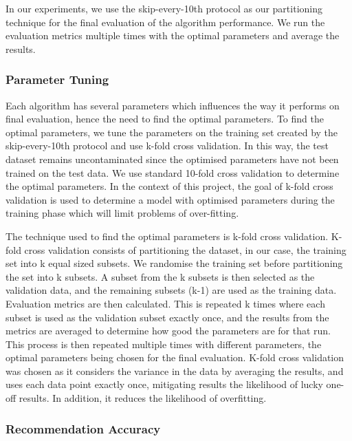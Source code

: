 In our experiments, we use the skip-every-10th protocol as our partitioning technique for the final evaluation of the algorithm performance. We run the evaluation metrics multiple times with the optimal parameters and average the results. 

\subsubsection{Parameter Tuning}

Each algorithm has several parameters which influences the way it performs on final evaluation, hence the need to find the optimal parameters. To find the optimal parameters, we tune the parameters on the training set created by the skip-every-10th protocol and use k-fold cross validation. In this way, the test dataset remains uncontaminated since the optimised parameters have not been trained on the test data. 
We use standard 10-fold cross validation to determine the optimal parameters. In the context of this project, the goal of k-fold cross validation is used to determine a model with optimised parameters during the training phase which will limit problems of over-fitting. 

The technique used to find the optimal parameters is k-fold cross validation. K-fold cross validation consists of partitioning the dataset, in our case, the training set into k equal sized subsets. We randomise the training set before partitioning the set into k subsets. A subset from the k subsets is then selected as the validation data, and the remaining subsets (k-1) are used as the training data. Evaluation metrics are then calculated. This is repeated k times where each subset is used as the validation subset exactly once, and the results from the metrics are averaged to determine how good the parameters are for that run. This process is then repeated multiple times with different parameters, the optimal parameters being chosen for the final evaluation. K-fold cross validation was chosen as it considers the variance in the data by averaging the results, and uses each data point exactly once, mitigating results the likelihood of lucky one-off results. In addition, it reduces the likelihood of overfitting. 

\subsubsection{Recommendation Accuracy}

